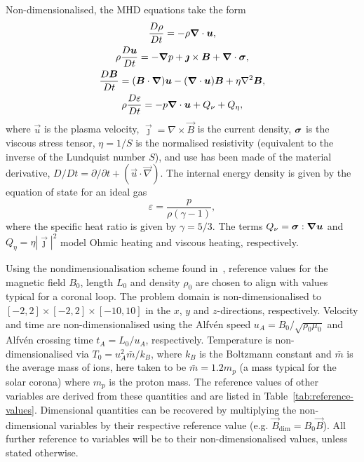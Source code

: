 Non-dimensionalised, the MHD equations take the form
\begin{gather}
\label{eq:mhda}
\frac{D\rho}{Dt} = - \rho \vec{\nabla} \cdot \vec{u},\\
\rho\frac{D\vec{u}}{Dt} = -\vec{\nabla} p + \vec{\jmath} \times \vec{B} + \vec{\nabla} \cdot \ten{\sigma},\\
\frac{D\vec{B}}{Dt} = (\vec{B} \cdot \vec{\nabla})\vec{u} - (\vec{\nabla} \cdot \vec{u})\vec{B} + \eta \nabla^2 \vec{B},\\
\rho\frac{D\varepsilon}{Dt} = -p \vec{\nabla} \cdot \vec{u} + {Q}_{\nu} + {Q}_{\eta},%
\label{eq:energy}
\end{gather}
where $\vec{u}$ is the plasma velocity, $\vec{\jmath} = \nabla
\times \vec{B}$ is the current density, ${\bm \sigma}$ is the viscous
stress tensor, $\eta = 1/S$ is the normalised resistivity (equivalent
to the inverse of the Lundquist number $S$), and use has been made of
the material derivative, $D/Dt = \partial/\partial t + (\vec{u} \cdot
\vec{\nabla})$. The internal energy density is given by the equation of state for an ideal gas
\begin{equation}
\varepsilon = \frac{p}{\rho(\gamma - 1)},
\end{equation}
where the specific heat ratio is given by $\gamma = 5/3$. The
  terms ${Q}_{\nu} = {\bm \sigma} : {\bm \nabla}{\bm u}$ and
  ${Q}_{\eta} = \eta | \vec{\jmath} |^2$ model Ohmic heating and viscous heating, respectively.

Using the nondimensionalisation scheme found
in~\cite{arberStaggeredGridLagrangian2001}, reference values for the
magnetic field $B_0$, length $L_0$ and density $\rho_0$ are chosen to
align with values typical for a coronal loop. The problem domain is
non-dimensionalised to $[-2,2] \times [-2,2] \times [-10,10]$ in the
$x$, $y$ and $z$-directions, respectively. Velocity and time are
non-dimensionalised using the Alfv\'en speed $u_A = B_0 / \sqrt{\rho_0
  \mu_0}$ and Alfv\'en crossing time $t_A = L_0/u_A$,
respectively. Temperature is non-dimensionalised via $T_0 = u_A^2
\bar{m} / k_B$, where $k_B$ is the Boltzmann constant and $\bar{m}$ is
the average mass of ions, here taken to be $\bar{m} = 1.2m_p$ (a mass
typical for the solar corona) where $m_p$ is the proton mass. The
reference values of other variables are derived from these
quantities and are listed in Table~\ref{tab:reference-values}. Dimensional quantities can be recovered by multiplying the non-dimensional variables by their respective reference value (e.g. $\vec{B}_{\dim} = B_0 \vec{B}$). All further reference to variables will be to their non-dimensionalised values, unless stated otherwise.

